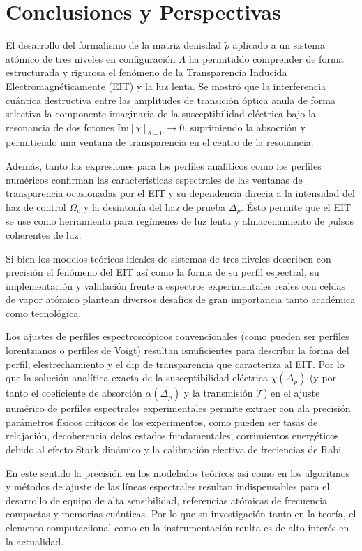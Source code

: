 \section{Conclusiones y Perspectivas}
El desarrollo del formalismo de la matriz denisdad  $\tilde{\rho}$ aplicado a un sistema atómico de tres niveles en configuración $\Lambda$ ha permitiddo comprender de forma estructurada y rigurosa el fenómeno de la Transparencia Inducida Electromagnéticamente (EIT) y la luz lenta. Se mostró que la interferencia cuántica destructiva entre las amplitudes de transición óptica anula de forma selectiva la componente imaginaria de la susceptibilidad eléctrica bajo la resonancia de dos fotones $\text{Im}[\chi]_{\delta = 0} \to 0$, suprimiendo la absocrión y permitiendo una ventana de transparencia en el centro de la resonancia.

Además, tanto las expresiones para los perfiles analíticos como los perfiles numéricos confirman las características espectrales de las ventanas de transparencia ocasionadas por el EIT y su dependencia direcia a la intensidad del haz de control $\Omega_c$ y la desintonía del haz de prueba $\Delta_p$. Ésto permite que el EIT se use como herramienta para regímenes de luz lenta y almacenamiento de pulsos coherentes de luz.

Si bien los modelos teóricos ideales de sistemas de tres niveles describen con precisión el fenómeno del EIT así como la forma de su perfil espectral, su implementación y validación frente a espectros experimentales reales con celdas de vapor atómico plantean diversos desafíos de gran importancia tanto académica como tecnológica.

Los ajustes de perfiles espectroscópicos convencionales (como pueden ser perfiles lorentzianos o perfiles de Voigt) resultan isnuficientes para describir la forma del perfil, elestrechamiento y el dip de transparencia que caracteriza al EIT. Por lo que la solución analítica exacta de la susceptibilidad eléctrica $\chi(\Delta_p)$ (y por tanto el coeficiente de absorción $\alpha (\Delta_p)$ y la transmisión $\mathcal{T}$) en el ajuste numérico de perfiles espectrales experimentales permite extraer con ala precisión parámetros físicos críticos de los experimentos, como pueden ser tasas de relajación, decoherencia delos estados fundamentales, corrimientos energéticos debido al efecto Stark dinámico y la calibración efectiva de freciencias de Rabi.

En este sentido la precisión en los modelados teóricos así como en los algoritmos y métodos de ajuste de las líneas espectrales resultan indispensables para el desarrollo de equipo de alta sensibilidad, referencias atómicas de frecuencia compactas y memorias cuánticas. Por lo que su investigación tanto en la teoría, el elemento computaciional como en la instrumentación reulta es de alto interés en la actualidad.
